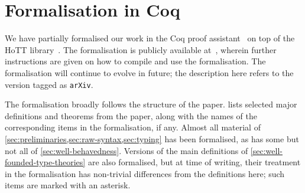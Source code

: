 \section{Formalisation in Coq}
\label{sec:formalisation-coq}

We have partially formalised our work in the Coq proof assistant~\citep{coq} on top of the HoTT library~\citep{bauer17:_hott}. The formalisation is publicly available at~\citep{lumsdaine:_formal}, wherein further instructions are given on how to compile and use the formalisation.
%
The formalisation will continue to evolve in future; the description here refers to the version tagged as \texttt{\small arXiv}.

The formalisation broadly follows the structure of the paper.
%
 lists selected major definitions and theorems from the paper, along with the names of the corresponding items in the formalisation, if any.
%
Almost all material of \cref{sec:preliminaries,sec:raw-syntax,sec:typing} has been formalised, as has some but not all of \cref{sec:well-behavedness}.
%
Versions of the main definitions of \cref{sec:well-founded-type-theories} are also formalised, but at time of writing, their treatment in the formalisation has non-trivial differences from the definitions here; such items are marked with an asterisk.
 
